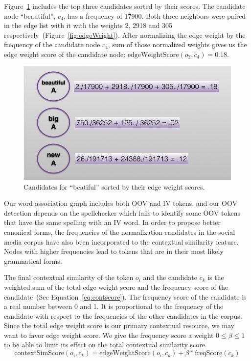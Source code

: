 \documentclass[a4paper,onesided,12pt]{report}
\begin{document}
Figure~\ref{fig:contextscores} includes the top three candidates sorted by their scores. The candidate node ``beautiful'', $c_4$, has a frequency of 17900. Both three neighbors were paired in the edge list with it with the weights 2, 2918 and 305 respectively~(Figure~\ref{fig:edgeWeight}). After normalizing the edge weight by the frequency of the candidate node  $c_4$, sum of those normalized weights gives us the edge weight score of the candidate node: $\text{edgeWeightScore}(o_2,c_4) = 0.18$.

\begin{figure}[htb]
\begin{center}
\includegraphics[scale=0.5]{fig/contextScores}
\caption{Candidates for ``beatiful'' sorted by their edge weight scores.}
\label{fig:contextscores}
\end{center}
\end{figure}

Our word association graph includes both OOV and IV tokens, and our OOV detection depends on the spellchecker which fails to identify some OOV tokens that have the same spelling with an IV word. In order to propose better canonical forms, the frequencies of the normalization candidates in the social media corpus have also been incorporated to the contextual similarity feature. Nodes with higher frequencies lead to tokens that are in their most likely grammatical forms.

The final contextual similarity of the token $o_i$ and the candidate $c_k$ is the weighted sum of the total edge weight score and the frequency score of the candidate~(See Equation~\ref{eq:contscore}). The frequency score of the candidate is a real number between 0 and 1. It is proportional to the frequency of the candidate with respect to the frequencies of the other candidates in the corpus. Since the total edge weight score is our primary contextual resource, we may want to favor edge weight score. We give the frequency score a weight $0 \leq \beta \leq 1$ to be able to limit its effect on the total contextual similarity score.
\begin{equation}
\text{contextSimScore}(o_i,c_k) = \text{edgeWeightScore}(o_i,c_k) + \beta * \text{freqScore}(c_k)
\label{eq:contscore}
\end{equation}
\end{document}
